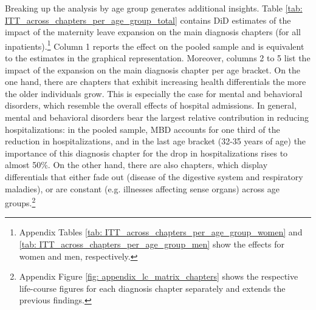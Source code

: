 \documentclass[11pt, a4paper]{article} %
\begin{document}
Breaking up the analysis by age group generates additional insights. Table \ref{tab: ITT_across_chapters_per_age_group_total} contains DiD estimates of the impact of the maternity leave expansion on the main diagnosis chapters (for all inpatients).\footnote{Appendix Tables \ref{tab: ITT_across_chapters_per_age_group_women} and \ref{tab: ITT_across_chapters_per_age_group_men} show the effects for women and men, respectively.} Column 1 reports the effect on the pooled sample and is equivalent to the estimates in the graphical representation. Moreover, columns 2 to 5 list the impact of the expansion on the main diagnosis chapter per age bracket. On the one hand, there are chapters that exhibit increasing health differentials the more the older individuals grow. This is especially the case for mental and behavioral disorders, which resemble the overall effects of hospital admissions. In general, mental and behavioral disorders bear the largest relative contribution in reducing hospitalizations: in the pooled sample, MBD accounts for one third of the reduction in hospitalizations, and in the last age bracket (32-35 years of age) the importance of this diagnosis chapter for the drop in hospitalizations rises to almost 50\%. On the other hand, there are also chapters, which display differentials that either fade out (disease of the digestive system and respiratory maladies), or are constant (e.g. illnesses affecting sense organs) across age groups.\footnote{Appendix Figure \ref{fig: appendix_lc_matrix_chapters} shows the respective life-course figures for each diagnosis chapter separately and extends the previous findings.}\newline 


\bigskip
\end{document}
